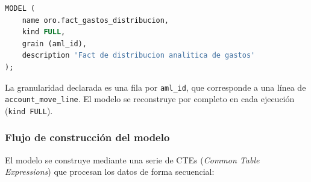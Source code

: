 \begin{lstlisting}[language=SQL, breaklines=true]
MODEL (
    name oro.fact_gastos_distribucion,
    kind FULL,
    grain (aml_id),
    description 'Fact de distribucion analitica de gastos'
);
\end{lstlisting}

La granularidad declarada es una fila por \texttt{aml\_id}, que corresponde a una línea de \texttt{account\_move\_line}. El modelo se reconstruye por completo en cada ejecución (\texttt{kind FULL}).

\subsubsection{Flujo de construcción del modelo}

El modelo se construye mediante una serie de CTEs (\textit{Common Table Expressions}) que procesan los datos de forma secuencial:

